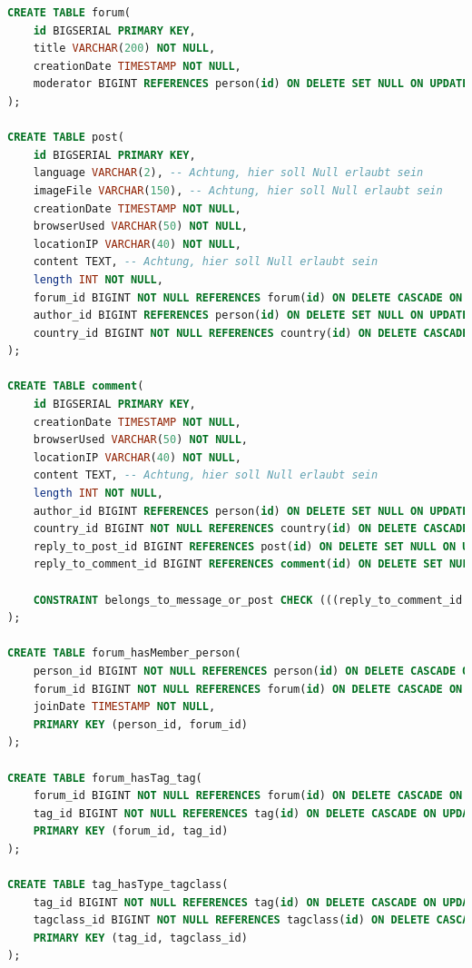 \begin{lstlisting}[language=sql]
CREATE TABLE forum(
    id BIGSERIAL PRIMARY KEY,
    title VARCHAR(200) NOT NULL,
    creationDate TIMESTAMP NOT NULL,
    moderator BIGINT REFERENCES person(id) ON DELETE SET NULL ON UPDATE CASCADE
);

CREATE TABLE post(
    id BIGSERIAL PRIMARY KEY,
    language VARCHAR(2), -- Achtung, hier soll Null erlaubt sein
    imageFile VARCHAR(150), -- Achtung, hier soll Null erlaubt sein
    creationDate TIMESTAMP NOT NULL,
    browserUsed VARCHAR(50) NOT NULL,
    locationIP VARCHAR(40) NOT NULL,
    content TEXT, -- Achtung, hier soll Null erlaubt sein
    length INT NOT NULL,
    forum_id BIGINT NOT NULL REFERENCES forum(id) ON DELETE CASCADE ON UPDATE CASCADE,
    author_id BIGINT REFERENCES person(id) ON DELETE SET NULL ON UPDATE CASCADE,
    country_id BIGINT NOT NULL REFERENCES country(id) ON DELETE CASCADE ON UPDATE CASCADE
);

CREATE TABLE comment(
    id BIGSERIAL PRIMARY KEY,
    creationDate TIMESTAMP NOT NULL,
    browserUsed VARCHAR(50) NOT NULL,
    locationIP VARCHAR(40) NOT NULL,
    content TEXT, -- Achtung, hier soll Null erlaubt sein
    length INT NOT NULL,
    author_id BIGINT REFERENCES person(id) ON DELETE SET NULL ON UPDATE CASCADE,
    country_id BIGINT NOT NULL REFERENCES country(id) ON DELETE CASCADE ON UPDATE CASCADE,
    reply_to_post_id BIGINT REFERENCES post(id) ON DELETE SET NULL ON UPDATE CASCADE,
    reply_to_comment_id BIGINT REFERENCES comment(id) ON DELETE SET NULL ON UPDATE CASCADE,

    CONSTRAINT belongs_to_message_or_post CHECK (((reply_to_comment_id IS NOT NULL) AND (reply_to_post_id IS NULL)) OR ((reply_to_comment_id IS NULL) AND (reply_to_post_id IS NOT NULL))) -- noch schauen ob das so geht, besser XOR!
);

CREATE TABLE forum_hasMember_person(
    person_id BIGINT NOT NULL REFERENCES person(id) ON DELETE CASCADE ON UPDATE CASCADE,
    forum_id BIGINT NOT NULL REFERENCES forum(id) ON DELETE CASCADE ON UPDATE CASCADE,
    joinDate TIMESTAMP NOT NULL,
    PRIMARY KEY (person_id, forum_id)
);

CREATE TABLE forum_hasTag_tag(
    forum_id BIGINT NOT NULL REFERENCES forum(id) ON DELETE CASCADE ON UPDATE CASCADE,
    tag_id BIGINT NOT NULL REFERENCES tag(id) ON DELETE CASCADE ON UPDATE CASCADE,
    PRIMARY KEY (forum_id, tag_id)
);

CREATE TABLE tag_hasType_tagclass(
    tag_id BIGINT NOT NULL REFERENCES tag(id) ON DELETE CASCADE ON UPDATE CASCADE,
    tagclass_id BIGINT NOT NULL REFERENCES tagclass(id) ON DELETE CASCADE ON UPDATE CASCADE,
    PRIMARY KEY (tag_id, tagclass_id)
);


\end{lstlisting}
